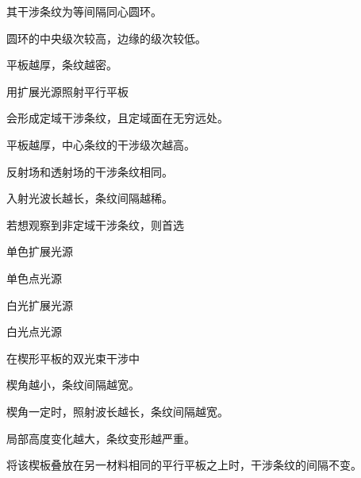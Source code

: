 \documentclass[standard, analysis, notocnum]{ExBook}
\newcommand{\answerarea}[1][8cm]{%
  \par\vspace{2mm}%
  \noindent{\color{themeColor!35}\rule{\linewidth}{0.4pt}}\par
  \noindent\begin{minipage}[t][#1][t]{\linewidth}\vspace{0pt}\end{minipage}\par
  \noindent{\color{themeColor!35}\rule{\linewidth}{0.4pt}}\par
}
\begin{document}
\begin{qitems}
\begin{bbox}
\par\noindent\hspace{2em}其干涉条纹为等间隔同心圆环。
\par\noindent\hspace{2em}圆环的中央级次较高，边缘的级次较低。
\par\noindent\hspace{2em}平板越厚，条纹越密。
\answerarea[3.5cm]
\end{bbox}
\begin{bbox}
\qitem 用扩展光源照射平行平板
\par\noindent\hspace{2em}会形成定域干涉条纹，且定域面在无穷远处。
\par\noindent\hspace{2em}平板越厚，中心条纹的干涉级次越高。
\par\noindent\hspace{2em}反射场和透射场的干涉条纹相同。
\par\noindent\hspace{2em}入射光波长越长，条纹间隔越稀。
\answerarea[3.5cm]
\end{bbox}
\begin{bbox}
\qitem 若想观察到非定域干涉条纹，则首选
\par\noindent\hspace{2em}单色扩展光源
\par\noindent\hspace{2em}单色点光源
\par\noindent\hspace{2em}白光扩展光源
\par\noindent\hspace{2em}白光点光源
\answerarea[3.5cm]
\end{bbox}
\begin{bbox}
\qitem 在楔形平板的双光束干涉中
\par\noindent\hspace{2em}楔角越小，条纹间隔越宽。
\par\noindent\hspace{2em}楔角一定时，照射波长越长，条纹间隔越宽。
\par\noindent\hspace{2em}局部高度变化越大，条纹变形越严重。
\par\noindent\hspace{2em}将该楔板叠放在另一材料相同的平行平板之上时，干涉条纹的间隔不变。

\end{bbox}
\end{qitems}
\end{document}
